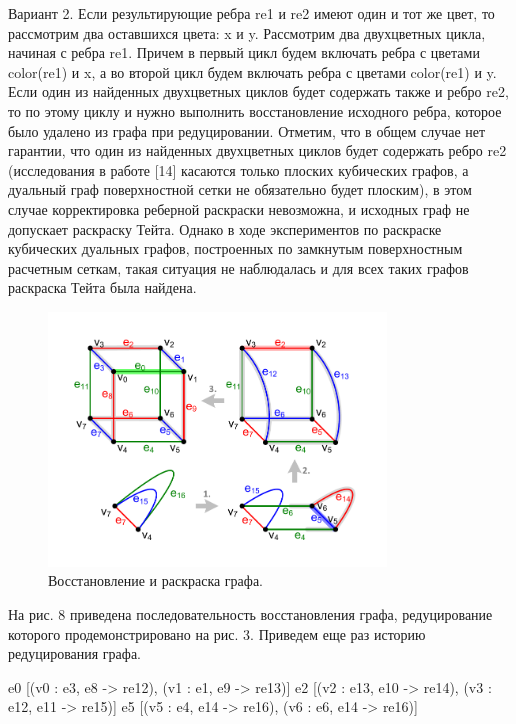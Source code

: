 Вариант 2. Если результирующие ребра re1 и re2 имеют один и тот же цвет, то рассмотрим два оставшихся цвета: x и y.
Рассмотрим два двухцветных цикла, начиная с ребра re1.
Причем в первый цикл будем включать ребра с цветами color(re1) и x, а во второй цикл будем включать ребра с цветами color(re1) и y.
Если один из найденных двухцветных циклов будет содержать также и ребро re2, то по этому циклу и нужно выполнить восстановление исходного ребра, которое было удалено из графа при редуцировании.
Отметим, что в общем случае нет гарантии, что один из найденных двухцветных циклов будет содержать ребро re2 (исследования в работе [14] касаются только плоских кубических графов, а дуальный граф поверхностной сетки не обязательно будет плоским), в этом случае корректировка реберной раскраски невозможна, и исходных граф не допускает раскраску Тейта.
Однако в ходе экспериментов по раскраске кубических дуальных графов, построенных по замкнутым поверхностным расчетным сеткам, такая ситуация не наблюдалась и для всех таких графов раскраска Тейта была найдена.

\begin{figure}[ht]
\centering
\includegraphics[width=0.8\textwidth]{./pics/text_3_edge_coloring/8-restore-and-repaint.pdf}
\singlespacing
{}\caption{Восстановление и раскраска графа.}
\label{fig:text_3_edge_coloring_8}
\end{figure}

На рис. 8 приведена последовательность восстановления графа, редуцирование которого продемонстрировано на рис. 3.
Приведем еще раз историю редуцирования графа.

e0 [(v0 : e3, e8 -> re12), (v1 : e1, e9 -> re13)]
e2 [(v2 : e13, e10 -> re14), (v3 : e12, e11 -> re15)]
e5 [(v5 : e4, e14 -> re16), (v6 : e6, e14 -> re16)]

